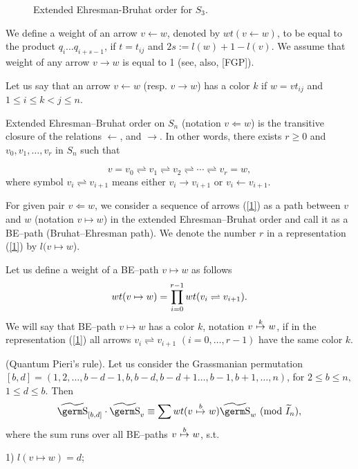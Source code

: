 {{\begin{figure}[hbtp]
\begin{picture}
\end{picture}
\medskip
\caption{Extended Ehresman-Bruhat order for $S_3$. }
\end{figure}


We define a weight of an arrow $v\leftarrow w$, denoted by 
$wt(v\leftarrow w)$, to be equal to the product %
$q_i\ldots q_{i+s-1}$, if $t=t_{ij}$ and $2s:=l(w)+1-l(v)$. We assume 
that weight of any arrow $v\to w$ is equal to 1 (see, also, [FGP]).

Let us say that an arrow $v\leftarrow w$ (resp. $v\to w$) 
has  a color $k$ if $w=vt_{ij}$ and $1\le i\le k<j\le n$. 

Extended Ehresman--Bruhat order on $S_n$ (notation 
$v\Leftarrow w$)
is the transitive closure of the 
relations $\leftarrow$, and $\rightarrow$. In other words, there 
exists $r\ge 0$ and 
$v_0,v_1,\ldots ,v_r$ in $S_n$ such that

\begin{equation} v=v_0\rightleftharpoons v_1\rightleftharpoons 
v_2\rightleftharpoons\cdots\rightleftharpoons v_r=w,
\label{1}
\end{equation}
where symbol $v_i\rightleftharpoons v_{i+1}$ means either $v_i\rightarrow 
v_{i+1}$ or $v_i\leftarrow v_{i+1}$. 

For given pair $v\Leftarrow w$, we consider a sequence of arrows (\ref{1})
as a path between $v$ and $w$ (notation $v\mapsto w$) in the extended
Ehresman--Bruhat order and call it as a BE--path (Bruhat--Ehresman path).
We denote the number $r$ in a 
representation (\ref{1}) by $l(v\mapsto w$).

Let us define a weight of a BE--path $v\mapsto w$ as follows 
$$wt(v\mapsto w)=
\ds\prod_{i=0}^{r-1}wt(v_i\rightleftharpoons v_{i+1}).
$$ 
We will say that 
BE--path $v\mapsto w$ has a color $k$, notation $v~{\buildrel k
\over\mapsto }~w$, if in the representation (\ref{1}) 
all arrows $v_i\rightleftharpoons v_{i+1}$ $(i=0,\ldots ,r-1)$ have the 
same color $k$.

\begin{th} (Quantum Pieri's rule). Let us consider the Grassmanian permutation 
$[b,d]=(1,2,\ldots ,b-d-1,b,b-d,b-d+1\ldots ,b-1,b+1,\ldots ,n)$, 
for $2\leq b\leq n,$ $1\leq d\leq b.$ Then
$$\wt{\s}_{[b,d]}\cdot\wt{\s}_v\equiv\sum wt(v~{\buildrel b
\over\mapsto }~w )\wt{\s}_w~(\mod \wt I_n),
$$
where the sum runs over all BE--paths $v~{\buildrel b\over\mapsto }~w$, 
s.t.

1) $l(v\mapsto w)=d$;
\vskip 0.2cm


\end{th}}}
